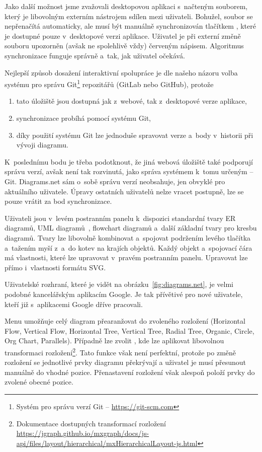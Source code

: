 Jako další možnost jsme zvažovali desktopovou aplikaci s~načteným souborem, který je libovolným externím nástrojem sdílen mezi uživateli.
Bohužel, soubor se nepřenačítá automaticky, ale musí být manuálně synchronizován tlačítkem , které je dostupné pouze v~desktopové verzi aplikace.
Uživatel je při externí změně souboru upozorněn (avšak ne spolehlivě vždy) červeným nápisem.
Algoritmus synchronizace funguje správně a~tak, jak uživatel očekává.

Nejlepší způsob dosažení interaktivní spolupráce je dle našeho názoru volba systému pro správu Git\footnote{Systém pro správu verzí Git -- \url{https://git-scm.com}} repozitářů (GitLab nebo GitHub), protože
\begin{enumerate}
  \item tato úložiště jsou dostupná jak z~webové, tak z~desktopové verze aplikace,
  \item synchronizace probíhá pomocí systému Git,
  \item díky použití systému Git lze jednoduše spravovat verze a~body v~historii při vývoji diagramu.
\end{enumerate}

K~poslednímu bodu je třeba podotknout, že jiná webová úložiště také podporují správu verzí, avšak není tak rozvinutá, jako správa systémem k~tomu určeným -- Git.
Diagrams.net sám o~sobě správu verzí neobsahuje, jen obvyklé  pro aktuálního uživatele.
Úpravy ostatních uživatelů nelze vracet postupně, lze se pouze vrátit za bod synchronizace.

Uživateli jsou v~levém postranním panelu k~dispozici standardní tvary ER diagramů, UML diagramů~\cite{uml2017}, flowchart diagramů a~další základní tvary pro kresbu diagramů.
Tvary lze libovolně kombinovat a~spojovat podržením levého tlačítka a~tažením myší z~a~do kotev na krajích objektů.
Každý objekt a~spojovací čára má vlastnosti, které lze upravovat v~pravém postranním panelu.
Upravovat lze přímo i~vlastnosti formátu SVG.

Uživatelské rozhraní, které je vidět na obrázku~\ref{fig:diagrams.net}, je velmi podobné kancelářským aplikacím Google.
Je tak přívětivé pro nové uživatele, kteří již s~aplikacemi Google dříve pracovali.

Menu  umožňuje celý diagram přearanžovat do zvoleného rozložení (Horizontal Flow, Vertical Flow, Horizontal Tree, Vertical Tree, Radial Tree, Organic, Circle, Org Chart, Parallels).
Případně lze zvolit , kde lze aplikovat libovolnou transformaci rozložení\footnote{Dokumentace dostupných transformací rozložení \url{https://jgraph.github.io/mxgraph/docs/js-api/files/layout/hierarchical/mxHierarchicalLayout-js.html}}.
Tato funkce však není perfektní, protože po změně rozložení se jednotlivé prvky diagramu překrývají a uživatel je musí přesunout manuálně do vhodné pozice.
Přenastavení rozložení však alespoň položí prvky do zvolené obecné pozice.


